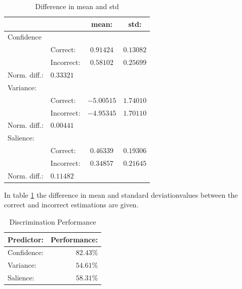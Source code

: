 \documentclass{article}
\begin{document}
\begin{table}[h]
    \begin{center}
        \begin{tabular}{ | l | l | c | c |}
            \hline
                        &           &   mean:       &   std:        \\ \hline
            Confidence  &           &               &               \\  \hline
                        & Correct:  &   $0.91424$   &   $0.13082$   \\  \hline
                        &Incorrect: &   $0.58102$   &   $0.25699$   \\  \hline
            Norm. diff.:    &   $0.33321$   &&\\  \hline
            \hline
            Variance:   &           &               &               \\  \hline
                        & Correct:  &   $-5.00515$  &   $1.74010$   \\  \hline
                        &Incorrect: &   $-4.95345$   &   $1.70110$   \\  \hline
            Norm. diff.:    &   $0.00441$   &&\\  \hline
            \hline
            Salience:   &           &               &               \\  \hline
                        & Correct:  &   $0.46339$   &   $0.19306$   \\  \hline
                        &Incorrect: &   $0.34857$   &   $0.21645$   \\  \hline
            Norm. diff.:    &   $0.11482$   &&\\  \hline
        \end{tabular}
        \caption{Difference in mean and std}
        \label{table:related}
    \end{center}
\end{table}
In table \ref{table:related} the difference in mean and standard deviationvalues between the correct and incorrect estimations are given.
\begin{table}[h]
    \begin{center}
        \begin{tabular}{ | l | r |}
            \hline
            Predictor:  &   Performance:\\  \hline
            \hline
            Confidence: &   $82.43\%$   \\  \hline
            Variance:   &   $54.61\%$   \\  \hline
            Salience:   &   $58.31\%$   \\  \hline
        \end{tabular}
        \caption{Discrimination Performance}
        \label{table:pred_cvs}
    \end{center}
\end{table}
\end{document}

